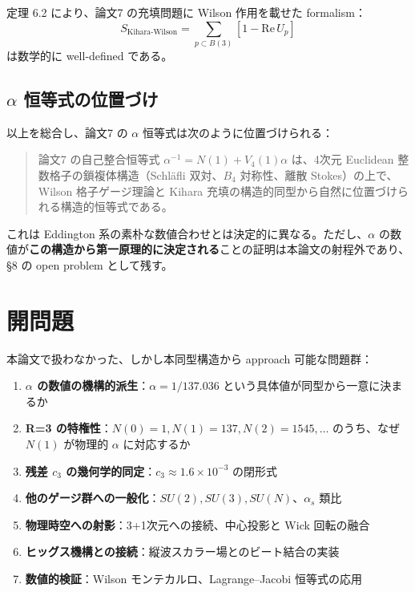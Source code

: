 \documentclass[a4paper,11pt]{ltjsarticle}
\begin{document}
定理 6.2 により、論文7 の充填問題に Wilson 作用を載せた formalism：
\begin{equation}
S_{\text{Kihara-Wilson}} = \sum_{p \subset B(3)} [1 - \text{Re}\, U_p] \tag{7.2}
\end{equation}
は数学的に well-defined である。

\subsection{$\alpha$ 恒等式の位置づけ}

以上を総合し、論文7 の $\alpha$ 恒等式は次のように位置づけられる：

\begin{quote}
論文7 の自己整合恒等式 $\alpha^{-1} = N(1) + V_4(1)\alpha$ は、4次元 Euclidean 整数格子の鎖複体構造（Schläfli 双対、$B_4$ 対称性、離散 Stokes）の上で、Wilson 格子ゲージ理論と Kihara 充填の構造的同型から自然に位置づけられる構造的恒等式である。
\end{quote}

これは Eddington 系の素朴な数値合わせとは決定的に異なる。ただし、$\alpha$ の数値が\textbf{この構造から第一原理的に決定される}ことの証明は本論文の射程外であり、§8 の open problem として残す。

\section{開問題}

本論文で扱わなかった、しかし本同型構造から approach 可能な問題群：

\begin{enumerate}
\item \textbf{$\alpha$ の数値の機構的派生}：$\alpha = 1/137.036$ という具体値が同型から一意に決まるか
\item \textbf{R=3 の特権性}：$N(0) = 1, N(1) = 137, N(2) = 1545, \ldots$ のうち、なぜ $N(1)$ が物理的 $\alpha$ に対応するか
\item \textbf{残差 $c_3$ の幾何学的同定}：$c_3 \approx 1.6 \times 10^{-3}$ の閉形式
\item \textbf{他のゲージ群への一般化}：$SU(2), SU(3), SU(N)$、$\alpha_s$ 類比
\item \textbf{物理時空への射影}：3+1次元への接続、中心投影と Wick 回転の融合
\item \textbf{ヒッグス機構との接続}：縦波スカラー場とのビート結合の実装
\item \textbf{数値的検証}：Wilson モンテカルロ、Lagrange--Jacobi 恒等式の応用
\end{enumerate}
\end{document}
